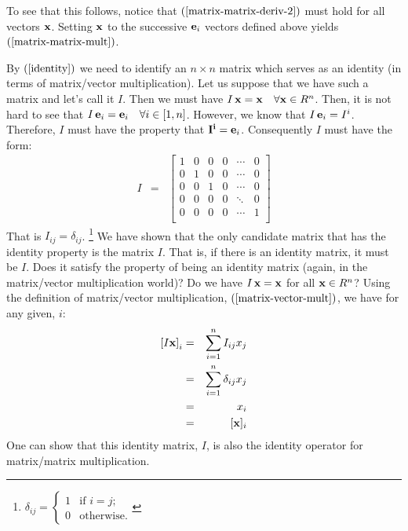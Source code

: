 \documentclass{article}
\begin{document}
To see that this follows, notice that $(\ref{matrix-matrix-deriv-2})$ must hold for all
vectors ${\bf x}$. Setting ${\bf x}$ to the successive ${\bf e}_i$ vectors defined
above yields $(\ref{matrix-matrix-mult})$.


By $(\ref{identity})$ we need to identify an $n \times n$ matrix which serves as an
identity (in terms of matrix/vector multiplication).
Let us suppose that we have such a matrix and let's call it $I$.
Then we must have $I \, {\bf x} = {\bf x} \quad \forall {\bf x} \in R^n$. 
Then, it is not hard
to see that $I \, {\bf e}_{i} = {\bf e}_i \quad \forall i \in [1, n]$. 
However, we know that $I \, {\bf e}_i = I^i$. Therefore, $I$
must have the property that ${\bf I^i} = {\bf e}_i$. Consequently $I$ must have the form:
\begin{eqnarray}
  I & = & \left[
      \begin{array}{cccccc}
        1 & 0 & 0 & 0 & \cdots & 0 \\
        0 & 1 & 0 & 0 & \cdots & 0 \\
        0 & 0 & 1 & 0 & \cdots & 0 \\
        0 & 0 & 0 & 0 & \ddots & 0 \\
        0 & 0 & 0 & 0 & \cdots & 1 \\
      \end{array}
  \right]
\end{eqnarray}
That is $I_{ij} = \delta_{ij}$.%
\footnote{$\delta_{ij} = \left\{\begin{array}{ll}
                                 1 & \text{if $i = j$;} \\
                                 0 & \text{otherwise.}
                               \end{array} \right.$}
We have shown that the only candidate matrix that has the identity property is the
matrix $I$. That is, if there is an identity matrix, it must be $I$. Does it satisfy
the property of being an identity matrix (again, in the matrix/vector multiplication world)?
Do we have $I \, {\bf x} = {\bf x}$ for all ${\bf x} \in R^n$?
Using the definition of matrix/vector multiplication, $(\ref{matrix-vector-mult})$, we
have for any given, $i$:
\begin{eqnarray}
  \left[I {\bf x}\right]_i & = & \sum_{i=1}^n I_{ij} x_j \nonumber \\
                           & = & \sum_{i=1}^n \delta_{ij} x_j \nonumber \\
                           & = & x_i \nonumber \\
                           & = & [{\bf x}]_i
\end{eqnarray}
One can show that this identity matrix, $I$, is also the identity operator for
matrix/matrix multiplication.
\end{document}
